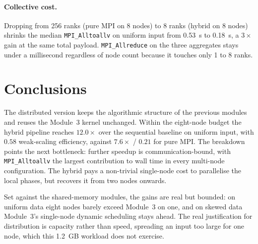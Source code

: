 \documentclass[10pt,twocolumn,a4paper]{article}
\begin{document}
\paragraph{Collective cost.}
Dropping from 256 ranks (pure MPI on 8 nodes) to 8 ranks (hybrid
on 8 nodes) shrinks the median \texttt{MPI\_Alltoallv} on uniform input
from \SI{0.53}{s} to \SI{0.18}{s}, a $3\times$ gain at the same
total payload. \texttt{MPI\_Allreduce} on the three aggregates stays
under a millisecond regardless of node count because it touches
only 1 to 8 ranks.

\section*{Conclusions}
The distributed version keeps the algorithmic structure of the
previous modules and reuses the Module~3 kernel unchanged.
Within the eight-node budget the hybrid pipeline reaches
$12.0\times$ over the sequential baseline on uniform input,
with $0.58$ weak-scaling efficiency, against $7.6\times$ / $0.21$
for pure MPI. The breakdown points the next bottleneck: further
speedup is communication-bound, with \texttt{MPI\_Alltoallv} the
largest contribution to wall time in every multi-node configuration.
The hybrid pays a non-trivial single-node cost to parallelise the
local phases, but recovers it from two nodes onwards.

Set against the shared-memory modules, the gains are real but bounded:
on uniform data eight nodes barely exceed Module~3 on one, and on skewed
data Module~3's single-node dynamic scheduling stays ahead. The real
justification for distribution is capacity rather than speed, spreading
an input too large for one node, which this \SI{1.2}{GB} workload does
not exercise.
\end{document}
